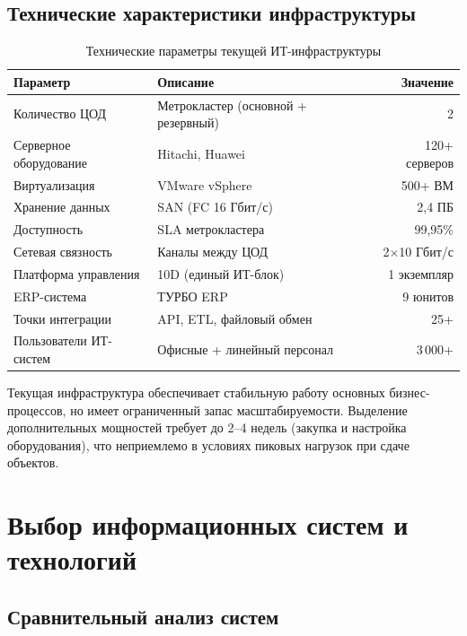 \documentclass[12pt,a4paper]{article}
\begin{document}
\subsection{Технические характеристики инфраструктуры}

\begin{table}[H]
\centering
\caption{Технические параметры текущей ИТ-инфраструктуры}
\label{tab:infra_params}
\small
\begin{tabularx}{\textwidth}{|l|X|r|}
\hline
\rowcolor{samoletlight}
\textbf{Параметр} & \textbf{Описание} & \textbf{Значение} \\
\hline
Количество ЦОД & Метрокластер (основной + резервный) & 2 \\
\hline
Серверное оборудование & Hitachi, Huawei & 120+ серверов \\
\hline
Виртуализация & VMware vSphere & 500+ ВМ \\
\hline
Хранение данных & SAN (FC 16 Гбит/с) & 2,4 ПБ \\
\hline
Доступность & SLA метрокластера & 99,95\% \\
\hline
Сетевая связность & Каналы между ЦОД & 2$\times$10 Гбит/с \\
\hline
Платформа управления & 10D (единый ИТ-блок) & 1 экземпляр \\
\hline
ERP-система & ТУРБО ERP & 9 юнитов \\
\hline
Точки интеграции & API, ETL, файловый обмен & 25+ \\
\hline
Пользователи ИТ-систем & Офисные + линейный персонал & 3\,000+ \\
\hline
\end{tabularx}
\end{table}

Текущая инфраструктура обеспечивает стабильную работу основных бизнес-процессов, но имеет ограниченный запас масштабируемости. Выделение дополнительных мощностей требует до 2--4 недель (закупка и настройка оборудования), что неприемлемо в условиях пиковых нагрузок при сдаче объектов.

\newpage

\section{Выбор информационных систем и технологий}

\subsection{Сравнительный анализ систем}
\end{document}
